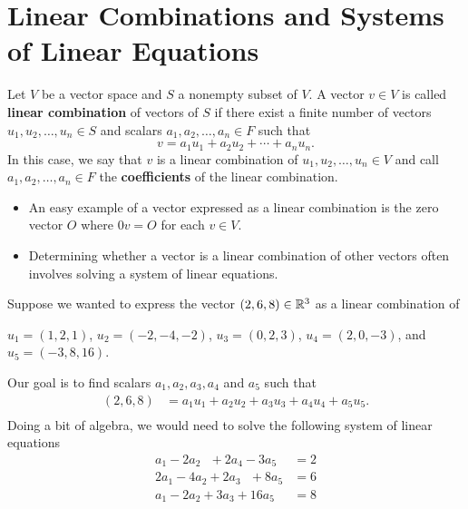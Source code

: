 \section{Linear Combinations and Systems of Linear Equations}

\begin{definition}
   Let \( V  \) be a vector space and \( S  \) a nonempty subset of \( V  \). A vector \( v \in V  \) is called \textbf{linear combination} of vectors of \( S  \) if there exist a finite number of vectors \( u_{1} , u_{2}, \dots, u_{n} \in S  \) and scalars \( a_{1}, a_{2} , \dots, a_{n} \in F  \) such that 
   \[  v = a_{1} u_{1} + a_{2} u_{2} + \cdots + a_{n} u_{n}. \] In this case, we say that \( v \) is a linear combination of \( u_{1} , u_{2} , \dots, u_{n} \in V   \) and call \( a_{1} , a_{2} , \dots, a_{n} \in F   \) the \textbf{coefficients} of the linear combination. 
\end{definition}

\begin{itemize}
    \item An easy example of a vector expressed as a linear combination is the zero vector \( O  \) where \( 0 v = O  \) for each \( v \in V  \).
    \item Determining whether a vector is a linear combination of other vectors often involves solving a system of linear equations.
\end{itemize}

\begin{eg}
    Suppose we wanted to express the vector \( (2,6,8) \in \mathbb{R}^{3}  \) as a linear combination of 
    \begin{center}
    \( u_{1} = (1,2,1)  \), \( u_{2} = (-2, -4, -2) \), \( u_{3} = (0,2,3) \), \( u_{4} = (2,0,-3) \), and \( u_{5} = (-3, 8, 16) \).
    \end{center}
    Our goal is to find scalars \( a_{1}, a_{2}, a_{3}, a_{4} \) and \( a_{5}  \) such that 
    \begin{align*}
        (2,6,8) &= a_{1} u_{1} + a_{2} u_{2} + a_{3} u_{3} + a_{4} u_{4} + a_{5}  u_{5}.   \\
    \end{align*}
    Doing a bit of algebra, we would need to solve the following system of linear equations 
    \begin{align*}
        a_{1} - 2a_{2}  \ \ \  + 2a_{4} - 3a_{5} &= 2  \\
        2a_{1} - 4a_{2} + 2a_{3}  \ \ \  + 8a_{5} &= 6  \\
        a_{1} - 2a_{2} + 3a_{3} + 16a_{5} &= 8
    \end{align*}
\end{eg}


